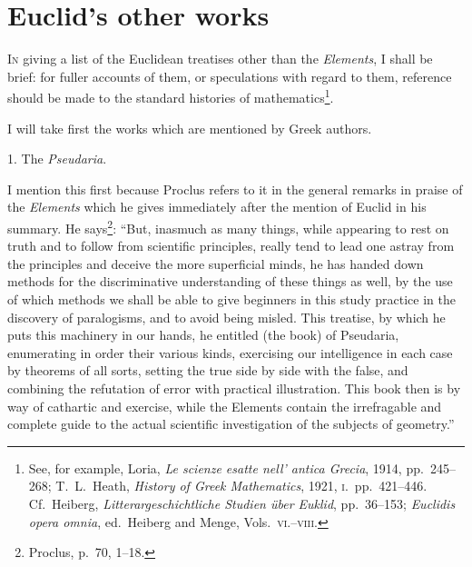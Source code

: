 \chapter{Euclid's other works}

\textsc{In} giving a list of the Euclidean treatises other than the \emph{Elements}, I shall be brief: for fuller accounts of them, or speculations with regard to them, reference should be made to the standard histories of mathematics\footnote{See, for example, Loria, \emph{Le scienze esatte nell' antica Grecia}, 1914, pp.~245--268; T.~L.~Heath, \emph{History of Greek Mathematics}, 1921, \textsc{i.}~pp.~421--446. Cf.~Heiberg, \emph{Litterargeschichtliche Studien über Euklid}, pp.~36--153; \emph{Euclidis opera omnia}, ed.~Heiberg and Menge, Vols.~\textsc{vi.--viii.}}.

I will take first the works which are mentioned by Greek authors.

1. The \emph{Pseudaria}.

I mention this first because Proclus refers to it in the general remarks in praise of the \emph{Elements} which he gives immediately after the mention of Euclid in his summary. He says\footnote{Proclus, p.~70, 1--18.}: ``But, inasmuch as many things, while appearing to rest on truth and to follow from scientific principles, really tend to lead one astray from the principles and deceive the more superficial minds, he has handed down methods for the discriminative understanding of these things as well, by the use of which methods we shall be able to give beginners in this study practice in the discovery of paralogisms, and to avoid being misled. This treatise, by which he puts this machinery in our hands, he entitled (the book) of Pseudaria, enumerating in order their various kinds, exercising our intelligence in each case by theorems of all sorts, setting the true side by side with the false, and combining the refutation of error with practical illustration. This book then is by way of cathartic and exercise, while the Elements contain the irrefragable and complete guide to the actual scientific investigation of the subjects of geometry.''


